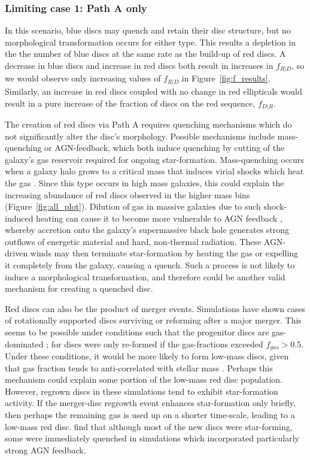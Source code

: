 \documentclass[useAMS,usenatbib]{mn2e}
\begin{document}
\subsubsection{Limiting case 1: Path A only}

In this scenario, blue discs may quench and retain their disc structure, but no morphological transformation occurs for either type. This results a depletion in the the number of blue discs at the same rate as the build-up of red discs. A decrease in blue discs and increase in red discs both result in increases in $f_{R|D}$, so we would observe only increasing values of $f_{R|D}$ in Figure~\ref{fig:f_results}. Similarly, an increase in red discs coupled with no change in red ellipticals would result in a pure increase of the fraction of discs on the red sequence, $f_{D|R}$.

The creation of red discs via Path A requires quenching mechanisms which do not significantly alter the disc's morphology. Possible mechanisms include mass-quenching or AGN-feedback, which both induce quenching by cutting of the galaxy's gas reservoir required for ongoing star-formation. Mass-quenching occurs when a galaxy halo grows to a critical mass that induces virial shocks which heat the gas \citep{Schawinski2007,Birnboim2003,Cattaneo2006}. Since this type occurs in high mass galaxies, this could explain the increasing abundance of red discs observed in the higher mass bins (Figure~\ref{fig:all_plot}). Dilution of gas in massive galaxies due to such shock-induced heating can cause it to become more vulnerable to AGN feedback \citep{Dekel2006}, whereby accretion onto the galaxy's supermassive black hole generates strong outflows of energetic material and hard, non-thermal radiation. These AGN-driven winds may then terminate star-formation by heating the gas or expelling it completely from the galaxy, causing a quench. Such a process is not likely to induce a morphological transformation, and therefore could be another valid mechanism for creating a quenched disc.

Red discs can also be the product of merger events. Simulations have shown cases of rotationally supported discs surviving or reforming after a major merger. This seems to be possible under conditions such that the progenitor discs are gas-dominated \citep{Governato2009,Springel2005a}; for \citet{Robertson2006} discs were only re-formed if the gas-fractions exceeded $f_{gas}>0.5$. Under these conditions, it would be more likely to form low-mass discs, given that gas fraction tends to anti-correlated with stellar mass \citep{Kannappan2004,Bell2000}. Perhaps this mechanism could explain some portion of the low-mass red disc population. However, regrown discs in these simulations tend to exhibit star-formation activity. If the merger-disc regrowth event enhances star-formation only briefly, then perhaps the remaining gas is used up on a shorter time-scale, leading to a low-mass red disc. \citet{Sparre2017} find that although most of the new discs were star-forming, some were immediately quenched in simulations which incorporated particularly strong AGN feedback. 
\end{document}

